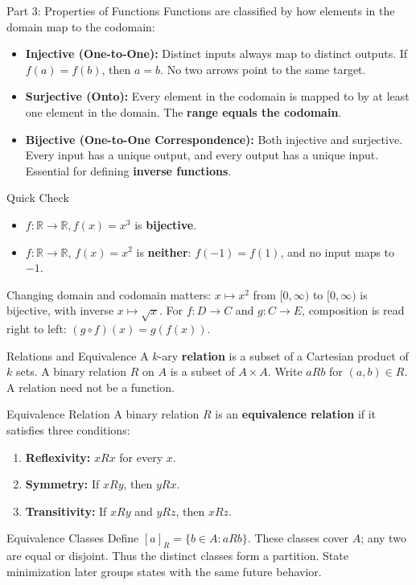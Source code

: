\documentclass[10pt]{beamer}
\begin{document}
\begin{frame}{Part 3: Properties of Functions}
  \small
  Functions are classified by how elements in the domain map to the codomain:
  \pause
  \begin{itemize}
      \item \textbf{Injective (One-to-One):} Distinct inputs always map to distinct outputs. If $f(a) = f(b)$, then $a = b$. No two arrows point to the same target.
      \pause
      \item \textbf{Surjective (Onto):} Every element in the codomain is mapped to by at least one element in the domain. The \textbf{range equals the codomain}.
      \pause
      \item \textbf{Bijective (One-to-One Correspondence):} Both injective and surjective. Every input has a unique output, and every output has a unique input. Essential for defining \textbf{inverse functions}.
  \end{itemize}
  \pause
  \begin{exampleblock}{Quick Check}
    \begin{itemize}
        \item $f: \mathbb{R} \rightarrow \mathbb{R}, f(x) = x^3$ is \textbf{bijective}.
        \item $f:\mathbb{R}\to\mathbb{R}$, $f(x)=x^2$ is \textbf{neither}:
          $f(-1)=f(1)$, and no input maps to $-1$.
    \end{itemize}
  \end{exampleblock}
  Changing domain and codomain matters: $x\mapsto x^2$ from
  $[0,\infty)$ to $[0,\infty)$ is bijective, with inverse $x\mapsto\sqrt{x}$.
  For $f:D\to C$ and $g:C\to E$, composition is read right to left:
  $(g\circ f)(x)=g(f(x))$.
\end{frame}


\begin{frame}{Relations and Equivalence}
  \small
  A $k$-ary \textbf{relation} is a subset of a Cartesian product of $k$ sets.
  A binary relation $R$ on $A$ is a subset of $A\times A$.
  Write $aRb$ for $(a,b)\in R$. A relation need not be a function.
  \pause
  \begin{block}{Equivalence Relation}
    A binary relation $R$ is an \textbf{equivalence relation} if it satisfies three conditions:
    \begin{enumerate}
        \item \textbf{Reflexivity:} $xRx$ for every $x$.
        \item \textbf{Symmetry:} If $xRy$, then $yRx$.
        \item \textbf{Transitivity:} If $xRy$ and $yRz$, then $xRz$.
    \end{enumerate}
  \end{block}
  \pause
  \begin{alertblock}{Equivalence Classes}
    Define $[a]_R=\{b\in A:aRb\}$. These classes cover $A$; any two
    are equal or disjoint. Thus the distinct classes form a partition.
    State minimization later groups states with the same future behavior.
  \end{alertblock}
\end{frame}
\end{document}
